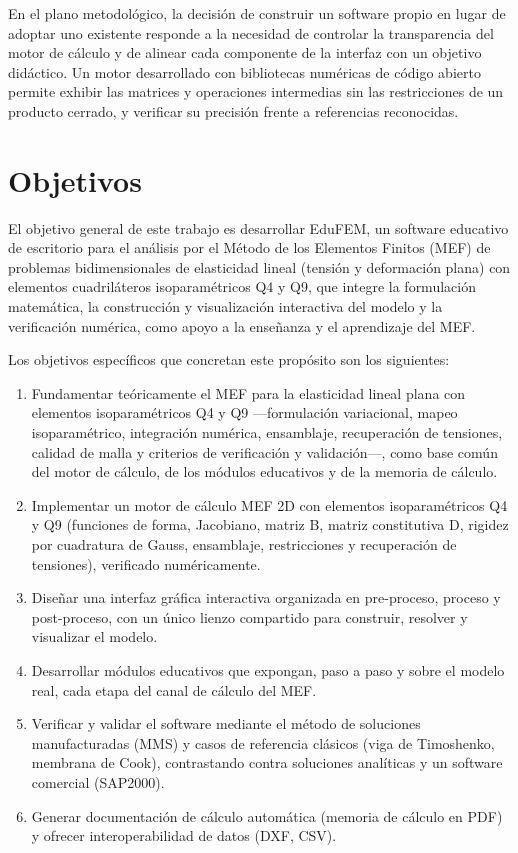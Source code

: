 En el plano metodológico, la decisión de construir un software propio en lugar de adoptar uno existente responde a la necesidad de controlar la transparencia del motor de cálculo y de alinear cada componente de la interfaz con un objetivo didáctico. Un motor desarrollado con bibliotecas numéricas de código abierto \autocite{harris2020numpy,virtanen2020scipy} permite exhibir las matrices y operaciones intermedias sin las restricciones de un producto cerrado, y verificar su precisión frente a referencias reconocidas.

\section*{Objetivos}

El objetivo general de este trabajo es desarrollar EduFEM, un software educativo de escritorio para el análisis por el Método de los Elementos Finitos (MEF) de problemas bidimensionales de elasticidad lineal (tensión y deformación plana) con elementos cuadriláteros isoparamétricos Q4 y Q9, que integre la formulación matemática, la construcción y visualización interactiva del modelo y la verificación numérica, como apoyo a la enseñanza y el aprendizaje del MEF.

Los objetivos específicos que concretan este propósito son los siguientes:

\begin{enumerate}
    \item Fundamentar teóricamente el MEF para la elasticidad lineal plana con elementos isoparamétricos Q4 y Q9 —formulación variacional, mapeo isoparamétrico, integración numérica, ensamblaje, recuperación de tensiones, calidad de malla y criterios de verificación y validación—, como base común del motor de cálculo, de los módulos educativos y de la memoria de cálculo.
    \item Implementar un motor de cálculo MEF 2D con elementos isoparamétricos Q4 y Q9 (funciones de forma, Jacobiano, matriz B, matriz constitutiva D, rigidez por cuadratura de Gauss, ensamblaje, restricciones y recuperación de tensiones), verificado numéricamente.
    \item Diseñar una interfaz gráfica interactiva organizada en pre-proceso, proceso y post-proceso, con un único lienzo compartido para construir, resolver y visualizar el modelo.
    \item Desarrollar módulos educativos que expongan, paso a paso y sobre el modelo real, cada etapa del canal de cálculo del MEF.
    \item Verificar y validar el software mediante el método de soluciones manufacturadas (MMS) y casos de referencia clásicos (viga de Timoshenko, membrana de Cook), contrastando contra soluciones analíticas y un software comercial (SAP2000).
    \item Generar documentación de cálculo automática (memoria de cálculo en PDF) y ofrecer interoperabilidad de datos (DXF, CSV).
\end{enumerate}

